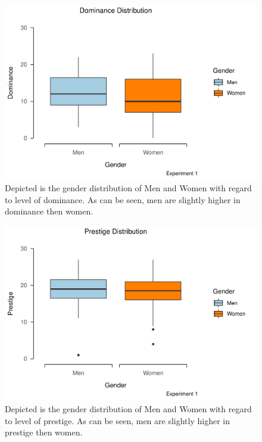 \documentclass[
  donotrepeattitle,doc, 12pt, a4paper,floatsintext]{apa7}
\begin{document}
\begin{figure}
\centering
\includegraphics{Output_Files/DoPL-Experiment_files/figure-latex/DominanceExperiment1-1.pdf}
\caption{\label{fig:DominanceExperiment1}Depicted is the gender distribution of Men and Women with regard to level of dominance. As can be seen, men are slightly higher in dominance then women.}
\end{figure}

\begin{figure}
\centering
\includegraphics{Output_Files/DoPL-Experiment_files/figure-latex/PrestigeExperiment1-1.pdf}
\caption{\label{fig:PrestigeExperiment1}Depicted is the gender distribution of Men and Women with regard to level of prestige. As can be seen, men are slightly higher in prestige then women.}
\end{figure}
\end{document}
